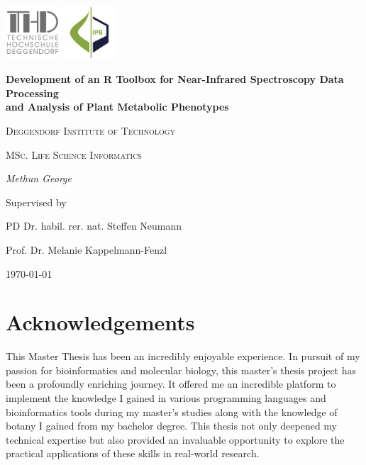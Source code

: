 \documentclass[12pt,a4paper]{report}
\begin{document}
\begin{titlepage}
    \centering
    \begin{flushright}
        \centering
        \includegraphics[width=2cm]{Figures/thd.png} %
        \hspace{0cm} %
        \includegraphics[width=2cm]{Figures/ipb.jpg} %
    \end{flushright}
    {\huge\bfseries Development of an R Toolbox for Near-Infrared Spectroscopy Data Processing \\
    and Analysis of Plant Metabolic Phenotypes\par}
    \vspace{2cm}
    {\LARGE \textsc{Deggendorf Institute of Technology}\par}
    \vspace{1cm}
    {\Large \textsc{MSc. Life Science Informatics}\par}
    \vspace{1.5cm}
    {\Large\itshape Methun George\par}
    \vfill
    Supervised by\par
    PD Dr. habil. rer. nat. Steffen Neumann\par
    Prof. Dr. Melanie Kappelmann-Fenzl
    \vfill
    {\large \today\par}
\end{titlepage}

\newpage
\section*{Acknowledgements}
This Master Thesis has been an incredibly enjoyable experience. In pursuit of my passion for bioinformatics and molecular biology, this master’s thesis project has been a profoundly enriching journey. It offered me an incredible platform to implement the knowledge I gained in various programming languages and bioinformatics tools during my master’s studies along with the knowledge of botany I gained from my bachelor degree. This thesis not only deepened my technical expertise but also provided an invaluable opportunity to explore the practical applications of these skills in real-world research. \\
\end{document}
